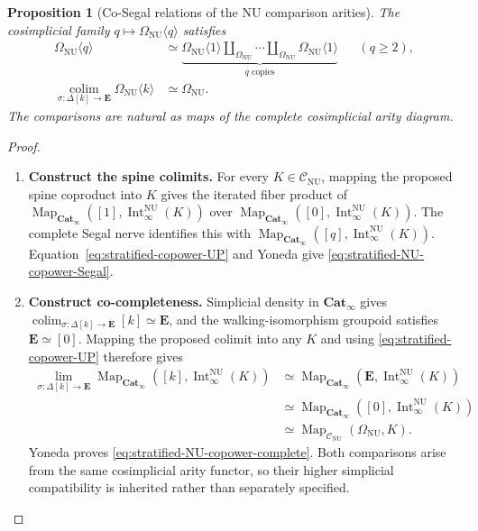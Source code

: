 \documentclass[oneside]{article}
\theoremstyle{plain}
\newtheorem{proposition}[theorem]{Proposition}
\theoremstyle{definition}
\theoremstyle{remark}
\newcommand{\CNU}{\mathcal C_{\mathrm{NU}}}
\newcommand{\Cat}{\mathbf{Cat}_{\infty}}
\newcommand{\Int}{\operatorname{Int}}
\newcommand{\Map}{\operatorname{Map}}
\newcommand{\NU}{\mathrm{NU}}
\newcommand{\colim}{\operatorname*{colim}}
\begin{document}
\begin{proposition}[Co-Segal relations of the NU comparison arities]
\label{prop:stratified-NU-copower-relations}
The cosimplicial family $q\mapsto\Omega_{\NU}\langle q\rangle$
satisfies
\begin{align}
 \Omega_{\NU}\langle q\rangle
 &\simeq
 \underbrace{\Omega_{\NU}\langle1\rangle
 \amalg_{\Omega_{\NU}}\cdots
 \amalg_{\Omega_{\NU}}\Omega_{\NU}\langle1\rangle}
 _{q\text{ copies}}
 &&(q\geq2),\label{eq:stratified-NU-copower-Segal}\\
 \operatorname*{colim}_{\sigma:\Delta[k]\to\mathbf E}
 \Omega_{\NU}\langle k\rangle
 &\simeq\Omega_{\NU}.
 \label{eq:stratified-NU-copower-complete}
\end{align}
The comparisons are natural as maps of the complete cosimplicial
arity diagram.
\end{proposition}
\begin{proof}
\leavevmode
\begin{enumerate}
\item \textbf{Construct the spine colimits.}
For every $K\in\CNU$, mapping the proposed spine coproduct into
$K$ gives the iterated fiber product of
$\Map_{\Cat}([1],\Int^{\NU}_\infty(K))$ over
$\Map_{\Cat}([0],\Int^{\NU}_\infty(K))$.
The complete Segal nerve identifies this with
$\Map_{\Cat}([q],\Int^{\NU}_\infty(K))$.
Equation~\eqref{eq:stratified-copower-UP} and Yoneda give
\eqref{eq:stratified-NU-copower-Segal}.
\item \textbf{Construct co-completeness.}
Simplicial density in $\Cat$ gives
$\colim_{\sigma:\Delta[k]\to\mathbf E}[k]\simeq\mathbf E$,
and the walking-isomorphism groupoid satisfies
$\mathbf E\simeq[0]$.  Mapping the proposed colimit into any $K$
and using \eqref{eq:stratified-copower-UP} therefore gives
\begin{align*}
 \lim_{\sigma:\Delta[k]\to\mathbf E}
 \Map_{\Cat}([k],\Int^{\NU}_\infty(K))
 &\simeq\Map_{\Cat}(\mathbf E,\Int^{\NU}_\infty(K))\\
 &\simeq\Map_{\Cat}([0],\Int^{\NU}_\infty(K))\\
 &\simeq\Map_{\CNU}(\Omega_{\NU},K).
\end{align*}
Yoneda proves \eqref{eq:stratified-NU-copower-complete}.  Both
comparisons arise from the same cosimplicial arity functor, so their
higher simplicial compatibility is inherited rather than separately
specified.\qedhere
\end{enumerate}
\end{proof}
\end{document}
